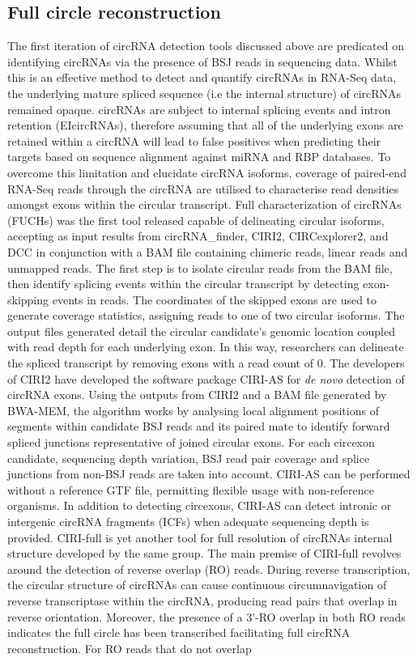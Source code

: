 \documentclass[journal,review,submit,pdftex,moreauthors]{Definitions/mdpi}
\begin{document}
\subsection{Full circle reconstruction} \label{Full circle reconstruction}
The first iteration of circRNA detection tools discussed above are predicated on identifying circRNAs via the presence of BSJ reads in sequencing data. Whilst this is an effective method to detect and quantify circRNAs in RNA-Seq data, the underlying mature spliced sequence (i.e the internal structure) of circRNAs remained opaque. circRNAs are subject to internal splicing events and intron retention (EIcircRNAs), therefore assuming that all of the underlying exons are retained within a circRNA will lead to false positives when predicting their targets based on sequence alignment against miRNA and RBP databases. To overcome this limitation and elucidate circRNA isoforms, coverage of paired-end RNA-Seq reads through the circRNA are utilised to characterise read densities amongst exons within the circular transcript. Full characterization of circRNAs (FUCHs) \cite{FUCHS} was the first tool released capable of delineating circular isoforms, accepting as input results from  circRNA\_finder, CIRI2, CIRCexplorer2, and DCC in conjunction with a BAM file containing chimeric reads, linear reads and unmapped reads. The first step is to isolate circular reads from the BAM file, then identify splicing events within the circular transcript by detecting exon-skipping events in reads. The coordinates of the skipped exons are used to generate coverage statistics, assigning reads to one of two circular isoforms. The output files generated detail the circular candidate's genomic location coupled with read depth for each underlying exon. In this way, researchers can delineate the spliced transcript by removing exons with a read count of 0. The developers of CIRI2 have developed the software package CIRI-AS \cite{CIRI-AS} for \textit{de novo} detection of circRNA exons. Using the outputs from CIRI2 and a BAM file generated by BWA-MEM, the algorithm works by analysing local alignment positions of segments within candidate BSJ reads and its paired mate to identify forward spliced junctions representative of joined circular exons. For each circexon candidate, sequencing depth variation, BSJ read pair coverage and splice junctions from non-BSJ reads are taken into account. CIRI-AS can be performed without a reference GTF file, permitting flexible usage with non-reference organisms. In addition to detecting circexons, CIRI-AS can detect intronic or intergenic circRNA fragments (ICFs) when adequate sequencing depth is provided. CIRI-full \cite{CIRI-full} is yet another tool for full resolution of circRNAs internal structure developed by the same group. The main premise of CIRI-full revolves around the detection of reverse overlap (RO) reads. During reverse transcription, the circular structure of circRNAs can cause continuous circumnavigation of reverse transcriptase within the circRNA, producing read pairs that overlap in reverse orientation. Moreover, the presence of a 3'-RO overlap in both RO reads indicates the full circle has been transcribed facilitating full circRNA reconstruction. For RO reads that do not overlap 
\end{document}
